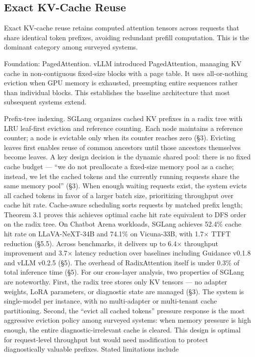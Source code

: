 \documentclass[preprint,12pt]{elsarticle}
\begin{document}
\subsection{Exact KV-Cache Reuse}



Exact KV-cache reuse retains computed attention tensors across requests that share identical token prefixes, avoiding redundant prefill computation. This is the dominant category among surveyed systems.


Foundation: PagedAttention. vLLM \cite{v5ref14} introduced PagedAttention, managing KV cache in non-contiguous fixed-size blocks with a page table. It uses all-or-nothing eviction when GPU memory is exhausted, preempting entire sequences rather than individual blocks. This establishes the baseline architecture that most subsequent systems extend.


Prefix-tree indexing. SGLang \cite{v5ref49} organizes cached KV prefixes in a radix tree with LRU leaf-first eviction and reference counting. Each node maintains a reference counter; a node is evictable only when its counter reaches zero (\S{}3). Evicting leaves first enables reuse of common ancestors until those ancestors themselves become leaves. A key design decision is the dynamic shared pool: there is no fixed cache budget --- ``we do not preallocate a fixed-size memory pool as a cache; instead, we let the cached tokens and the currently running requests share the same memory pool'' (\S{}3). When enough waiting requests exist, the system evicts all cached tokens in favor of a larger batch size, prioritizing throughput over cache hit rate. Cache-aware scheduling sorts requests by matched prefix length; Theorem 3.1 proves this achieves optimal cache hit rate equivalent to DFS order on the radix tree. On Chatbot Arena workloads, SGLang achieves 52.4\% cache hit rate on LLaVA-NeXT-34B and 74.1\% on Vicuna-33B, with 1.7$\times$ TTFT reduction (\S{}5.5). Across benchmarks, it delivers up to 6.4$\times$ throughput improvement and 3.7$\times$ latency reduction over baselines including Guidance v0.1.8 and vLLM v0.2.5 (\S{}5). The overhead of RadixAttention itself is under 0.3\% of total inference time (\S{}5). For our cross-layer analysis, two properties of SGLang are noteworthy. First, the radix tree stores only KV tensors --- no adapter weights, LoRA parameters, or diagnostic state are managed (\S{}3). The system is single-model per instance, with no multi-adapter or multi-tenant cache partitioning. Second, the ``evict all cached tokens'' pressure response is the most aggressive eviction policy among surveyed systems: when memory pressure is high enough, the entire diagnostic-irrelevant cache is cleared. This design is optimal for request-level throughput but would need modification to protect diagnostically valuable prefixes. Stated limitations include
\end{document}
